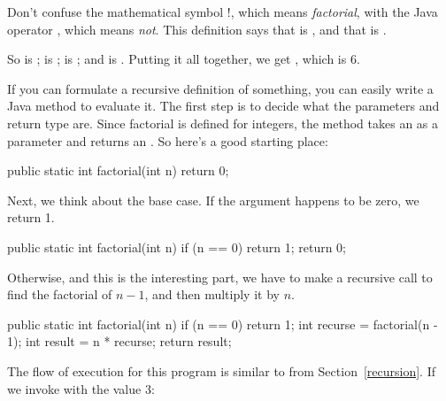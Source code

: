 Don't confuse the mathematical symbol $!$, which means {\em factorial}, with the Java operator \java{!}, which means {\em not}.
This definition says that  is , and that  is .

So  is ;  is ;  is ; and  is .
Putting it all together, we get , which is 6.

If you can formulate a recursive definition of something, you can easily write a Java method to evaluate it.
The first step is to decide what the parameters and return type are.
Since factorial is defined for integers, the method takes an  as a parameter and returns an .
So here's a good starting place:

\begin{code}
public static int factorial(int n) {
    return 0;
}
\end{code}

Next, we think about the base case.
If the argument happens to be zero, we return 1.

\begin{code}
public static int factorial(int n) {
    if (n == 0) {
        return 1;
    }
    return 0;
}
\end{code}

Otherwise, and this is the interesting part, we have to make a recursive call to find the factorial of $n-1$, and then multiply it by $n$.

\begin{code}
public static int factorial(int n) {
    if (n == 0) {
        return 1;
    }
    int recurse = factorial(n - 1);
    int result = n * recurse;
    return result;
}
\end{code}

The flow of execution for this program is similar to  from Section~\ref{recursion}.
If we invoke  with the value 3:

